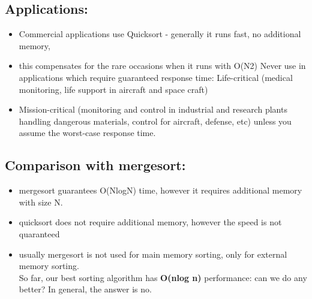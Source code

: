 \documentclass{article}
\begin{document}
	\subsection{ Applications:}
	\begin{itemize}
		\item Commercial applications use Quicksort - generally it runs fast, no additional memory, 
		\item this compensates for the rare occasions when it runs with O(N2)
		Never use in applications which require guaranteed response time:
		Life-critical (medical monitoring, life support in aircraft and space craft) 
		\item Mission-critical (monitoring and control in industrial and research plants handling dangerous materials, control for aircraft, defense, etc) 
		unless you assume the worst-case response time.
	\end{itemize}      
	\subsection{ Comparison with mergesort: }
	\begin{itemize}
		\item 
		mergesort guarantees O(NlogN) time, however it requires additional memory with size N. 
		\item quicksort does not require additional memory, however the speed is not quaranteed 
		\item usually mergesort is not used for main memory sorting, only for external memory sorting. \\
		So far, our best sorting algorithm has \textbf{O(nlog n)} performance: can we do any better? 
		In general, the answer is no.
	\end{itemize}
	
	
\end{document}
